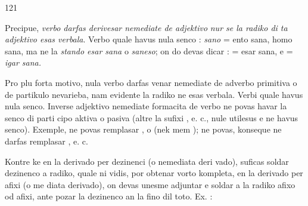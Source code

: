 \begin{VUpage}[125]{121}

Precipue, \textit{verbo darfas derivesar nemediate de adjektivo}\nl
\textit{nur se la radiko di ta adjektivo esas verbala}. Verbo quale\nl
{} havus nula senco : \textit{sano} = ento sana, homo sana,\nl
ma ne la \textit{stando esar sana} o \textit{saneso}; on do devas dicar : \cc
{} = esar sana, e  = \textit{igar sana.}

Pro plu forta motivo, nula verbo darfas venar nemediate de\nl
adverbo primitiva o de partikulo nevarieba, nam evidente la\nl
radiko ne esas verbala. Verbi quale \cc
{} havus nula senco. Inverse adjektivo\nl
nemediate formacita de verbo ne povas havar la senco di parti\cc
cipo aktiva o pasiva (altre la sufixi , e. c., nule utilesus\nl
e ne havus senco). Exemple,  ne povas remplasar\nl
{}, o  (nek mem ); \nl
ne povas, konseque ne darfas remplasar \nl
{}, e. c.

\VUsaut{5.48mm}
\VUsaut{4.60mm}

\VUsaut{4.45mm}

Kontre ke en la derivado per dezinenci (o nemediata deri\cc
vado), suficas soldar dezinenco a radiko, quale ni vidis,\nl
por obtenar vorto kompleta, en la derivado per afixi (o me\cc
diata derivado), on devas unesme adjuntar e soldar a la\nl
radiko afixo od afixi, ante pozar la dezinenco an la fino\nl
dil toto. Ex. : \cc
{}


\end{VUpage}
